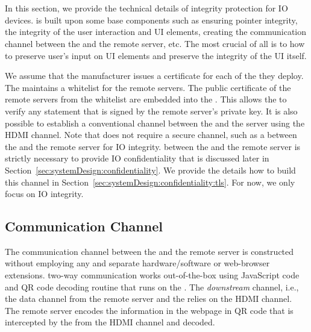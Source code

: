 \section{\name}
\label{sec:systemDesign}


In this section, we provide the technical details of \name integrity protection for IO devices. \name is built upon some base components such as ensuring pointer integrity, the integrity of the user interaction and UI elements, creating the communication channel between the \device and the remote server, etc. The most crucial of all is to how to preserve user's input on UI elements and preserve the integrity of the UI itself.


 We assume that the \device manufacturer issues a certificate for each of the \device they deploy. The \device maintains a whitelist for the remote servers. The public certificate of the remote servers from the whitelist are embedded into the \device. This allows the \device to verify any statement that is signed by the remote server's private key. It is also possible to establish a conventional \tls channel between the \device and the server using the HDMI channel. Note that \name does not require a secure channel, such as a \tls between the \device and the remote server for IO integrity. \tls between the \device and the remote server is strictly necessary to provide IO confidentiality that is discussed later in Section~\ref{sec:systemDesign:confidentiality}. We provide the details how to build this \tls channel in Section~\ref{sec:systemDesign:confidentiality:tls}. For now, we only focus on IO integrity.




\iffalse
\subsection{Communication Channel}
\label{sec:systemDesign:communicationChannel}

The communication channel between the \device and the remote server is constructed without employing any and separate hardware/software or web-browser extensions. \name two-way communication works out-of-the-box using JavaScript code and QR code decoding routine that runs on the \device. The \emph{downstream} channel, i.e., the data channel from the remote server and the \device relies on the HDMI channel. The remote server encodes the information in the webpage in QR code that is intercepted by the \device from the HDMI channel and decoded.

